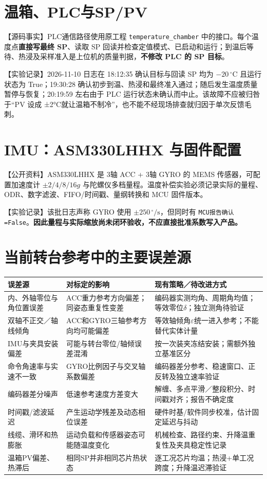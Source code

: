 \documentclass[UTF8,a4paper,11pt,oneside,openany,fontset=none]{ctexbook}
\newcommand{\degc}{\,^{\circ}\mathrm C}
\newcommand{\dps}{\,^{\circ}/\mathrm s}
\begin{document}
\section{温箱、PLC与SP/PV}
【源码事实】PLC通信路径使用原工程 \texttt{temperature\_chamber} 中的接口。每个温度点\textbf{直接写最终 SP}、读取 SP 回读并检查定值模式、已启动和运行；到温后等待、热浸及采样准入是上位机的质量判据，\textbf{不修改 PLC 的 SP 目标}。

【实验记录】2026-11-10 日志在 18:12:35 确认目标与回读 SP 均为 $-20\degc$ 且运行状态为 True；19:30:28 确认初步到温、热浸和最终准入通过；随后发生温度质量暂停与恢复；20:19:59 左右由于 PLC 运行状态未确认而中止。该故障不应被归咎于“PV 设成 ±2°C就让温箱不制冷”，也不能不经现场排查就归因于单次反馈毛刺。

\section{IMU：ASM330LHHX 与固件配置}
【公开资料】ASM330LHHX 是 3轴 ACC + 3轴 GYRO 的 MEMS 传感器，可配置加速度计 $\pm2/4/8/16g$ 与陀螺仪多档量程。温度补偿实验必须记录实际的量程、ODR、数字滤波、FIFO/时间戳、量纲转换和 MCU 固件版本\cite{ST}。

【实验记录】该批日志声称 GYRO 使用 $\pm250\dps$，但同时有 \texttt{MCU报告确认=False}。\textbf{因此量程与实际缩放尚未闭环验收，不应直接批准系数写入产品。}

\section{当前转台参考中的主要误差源}
\begin{longtable}{p{3.0cm}p{5.0cm}p{5.0cm}}
\toprule
误差源 & 对标定的影响 & 现有策略／待改进方式\\\midrule\endhead
内、外轴零位与角位置误差 & ACC重力参考方向偏差；同姿态重复性变差 & 编码器实测均角、周期角均值；等效零位$\delta$；独立测角待验证\\
双轴不正交／轴线倾角 & ACC和GYRO三轴参考方向均可能偏差 & 等效轴倾角$\varepsilon$统一进入参考；不能替代实体计量\\
IMU与夹具安装偏差 & 可能与转台零位/轴倾误差混淆 & 按一次装夹冻结安装；需额外独立基准区分\\
命令角速率与实速不一致 & GYRO比例因子与交叉轴系数偏差 & 编码器差分参考、稳速窗口、正反转及独立速率验证\\
编码器差分噪声 & 低速参考速度方差变大 & 解缠、多点平滑／整段积分、时间戳对齐；报告不确定度\\
时间戳/滤波延迟 & 产生运动学残差及动态相位误差 & 硬件时基/软件同步校准，估计固定延迟与抖动\\
线缆、滑环和热膨胀 & 运动负载和传感器姿态可能随温度变化 & 机械检查、路径约束、升降温重复性及夹具稳定性记录\\
温箱PV偏差、热滞后 & 相同SP并非相同芯片热状态 & 逐工况芯片均温；热浸+单工况跨度；升降温迟滞验证\\
\bottomrule
\end{longtable}
\end{document}
